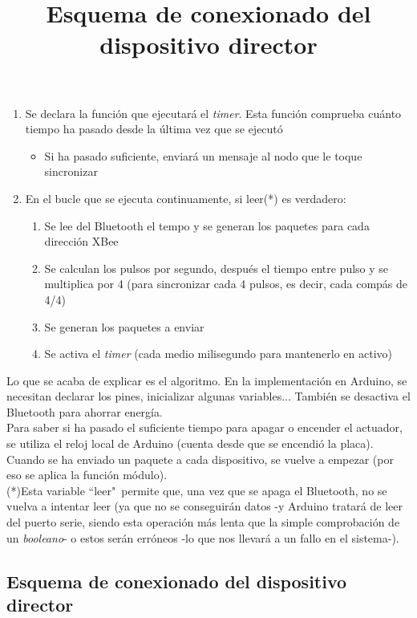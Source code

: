   \begin{enumerate}
  \item Se declara la función que ejecutará el \textit{timer}. Esta función comprueba cuánto
   tiempo ha pasado desde la última vez que se ejecutó
    \begin{itemize}
      \item Si ha pasado suficiente, enviará un mensaje al nodo que le toque sincronizar
    \end{itemize}
  \item En el bucle que se ejecuta continuamente, si leer(*) es verdadero:
    \begin{enumerate}
      \item Se lee del Bluetooth el tempo y se generan los paquetes para cada dirección XBee
      \item Se calculan los pulsos por segundo, después el tiempo entre pulso y se multiplica
      por 4 (para sincronizar cada 4 pulsos, es decir, cada compás de 4/4)
      \item Se generan los paquetes a enviar
      \item Se activa el \textit{timer} (cada medio milisegundo para mantenerlo en activo)
    \end{enumerate}
\end{enumerate}

Lo que se acaba de explicar es el algoritmo. En la implementación en Arduino, se necesitan
declarar los pines, inicializar algunas variables... También se desactiva el Bluetooth para
ahorrar energía.\\

Para saber si ha pasado el suficiente tiempo para apagar o encender el actuador, se utiliza el reloj local
de Arduino (cuenta desde que se encendió la placa).\\

Cuando se ha enviado un paquete a cada dispositivo, se vuelve a empezar (por eso se aplica la función módulo).\\

(*)Esta variable ``leer"\ permite que, una vez que se apaga el Bluetooth, no se vuelva a intentar leer
(ya que no se conseguirán datos -y Arduino tratará de leer del puerto serie, siendo esta operación
más lenta que la simple comprobación de un \textit{booleano}- o estos serán erróneos
-lo que nos llevará a un fallo en el sistema-).\\


\subsection{Esquema de conexionado del dispositivo director}
\title{Esquema de conexionado del dispositivo director}

